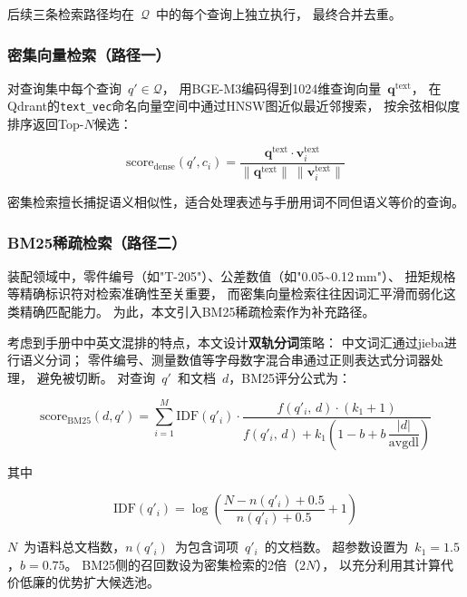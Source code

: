 后续三条检索路径均在~$\mathcal{Q}$~中的每个查询上独立执行，
最终合并去重。

\subsubsection{密集向量检索（路径一）}
\label{sec:dense}

对查询集中每个查询~$q' \in \mathcal{Q}$，
用BGE-M3编码得到1024维查询向量~$\mathbf{q}^{\text{text}}$，
在Qdrant的\texttt{text\_vec}命名向量空间中通过HNSW图近似最近邻搜索，
按余弦相似度排序返回Top-$N$候选：

\begin{equation}
  \text{score}_{\text{dense}}(q', c_i)
  = \frac{\mathbf{q}^{\text{text}} \cdot \mathbf{v}_i^{\text{text}}}
         {\|\mathbf{q}^{\text{text}}\|\ \|\mathbf{v}_i^{\text{text}}\|}
  \label{eq:dense-score}
\end{equation}

密集检索擅长捕捉语义相似性，适合处理表述与手册用词不同但语义等价的查询。

\subsubsection{BM25稀疏检索（路径二）}
\label{sec:bm25}

装配领域中，零件编号（如"T-205"）、公差数值（如"0.05\textasciitilde0.12\,mm"）、
扭矩规格等精确标识符对检索准确性至关重要，
而密集向量检索往往因词汇平滑而弱化这类精确匹配能力。
为此，本文引入BM25稀疏检索作为补充路径。

考虑到手册中中英文混排的特点，本文设计\textbf{双轨分词}策略：
中文词汇通过jieba进行语义分词；
零件编号、测量数值等字母数字混合串通过正则表达式分词器处理，
避免被切断。
对查询~$q'$~和文档~$d$，BM25评分公式为：

\begin{equation}
  \text{score}_{\text{BM25}}(d, q')
  = \sum_{i=1}^{M} \text{IDF}(q'_i)
    \cdot \frac{f(q'_i,\, d) \cdot (k_1 + 1)}
               {f(q'_i,\, d)
                + k_1\!\left(1 - b + b\,\dfrac{|d|}{\text{avgdl}}\right)}
  \label{eq:bm25}
\end{equation}

其中

\begin{equation}
  \text{IDF}(q'_i)
  = \log\!\left(\frac{N - n(q'_i) + 0.5}{n(q'_i) + 0.5} + 1\right)
  \label{eq:idf}
\end{equation}

$N$~为语料总文档数，$n(q'_i)$~为包含词项~$q'_i$~的文档数。
超参数设置为~$k_1 = 1.5$，$b = 0.75$。
BM25侧的召回数设为密集检索的2倍（$2N$），
以充分利用其计算代价低廉的优势扩大候选池。

